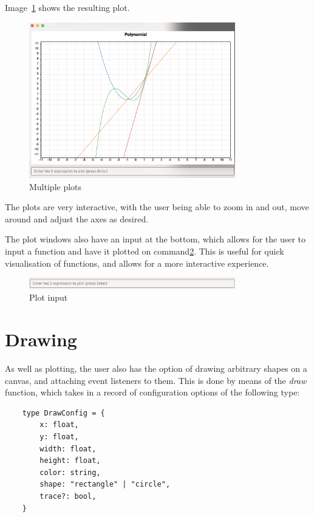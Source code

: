 Image~\ref{fig:multiple-plots} shows the resulting plot.

\begin{figure}[H]
    \centering
    \includegraphics[width=0.8\textwidth]{multiplePlots}
    \caption{Multiple plots}\label{fig:multiple-plots}
\end{figure}

The plots are very interactive, with the user being able to zoom in and out, move around and adjust the axes as
desired.

The plot windows also have an input at the bottom, which allows for the user to input a function and have it plotted
on command\ref{fig:plot-input}.
This is useful for quick visualisation of functions, and allows for a more interactive experience.

\begin{figure}[H]
    \centering
    \includegraphics[width=0.8\textwidth]{plotInput}
    \caption{Plot input}\label{fig:plot-input}
\end{figure}

\section{Drawing}\label{sec:drawing}

As well as plotting, the user also has the option of drawing arbitrary shapes on a canvas, and attaching event 
listeners to them.
This is done by means of the \textit{draw} function, which takes in a record of configuration options of the following
type:

\begin{verbatim}
    type DrawConfig = {
        x: float,
        y: float,
        width: float,
        height: float,
        color: string,
        shape: "rectangle" | "circle",
        trace?: bool, 
    }
\end{verbatim}

